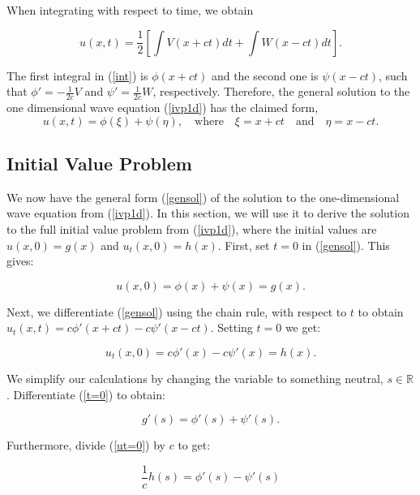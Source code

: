 \documentclass[a4paper, 12pt]{article}
\numberwithin{equation}{section}
\begin{document}
When integrating with respect to time, we obtain

\begin{equation} \label{int}
    u(x,t)=\frac{1}{2}\left[\int{V(x+ct)dt}+\int{W(x-ct)dt}\right].
\end{equation}

The first integral in (\ref{int}) is $\phi(x+ct)$ and the second one is $\psi(x-ct)$, such that $\phi'=-\frac{1}{2c}V$ and $\psi'=\frac{1}{2c}W$, respectively.
Therefore, the general solution to the one dimensional wave equation (\ref{ivp1d}) has the claimed form, 
\begin{equation} \label{gensol}
    u(x, t)=\phi(\xi)+\psi(\eta), \quad \textrm{where} \quad \xi=x+ct \quad \textrm{and} \quad \eta=x-ct.
\end{equation}

\subsection{Initial Value Problem}
We now have the general form (\ref{gensol}) of the solution to the one-dimensional wave equation from (\ref{ivp1d}). In this section, we will use it to derive the solution to
the full initial value problem from (\ref{ivp1d}), where the initial values are $u(x,0)=g(x)$ and $u_t(x,0)=h(x)$. First, set $t=0$ in (\ref{gensol}). This gives:

\begin{equation} \label{t=0}
    u(x,0)=\phi(x)+\psi(x)=g(x).
\end{equation}

Next, we differentiate (\ref{gensol}) using the chain rule, with respect to $t$ to obtain $u_t(x,t)=c\phi'(x+ct)-c\psi'(x-ct)$. Setting $t=0$ we get:

\begin{equation} \label{ut=0}
    u_t(x,0)=c\phi'(x)-c\psi'(x)=h(x).
\end{equation}

We simplify our calculations by changing the variable to something neutral, $s \in \mathbb{R}$. 
Differentiate (\ref{t=0}) to obtain:

\begin{equation} \label{eqq9}
    g'(s)=\phi'(s)+\psi'(s).
\end{equation}

Furthermore, divide (\ref{ut=0}) by $c$ to get:

\begin{equation} \label{eqq10}
    \frac{1}{c}h(s)=\phi'(s)-\psi'(s)
\end{equation}
\end{document}
